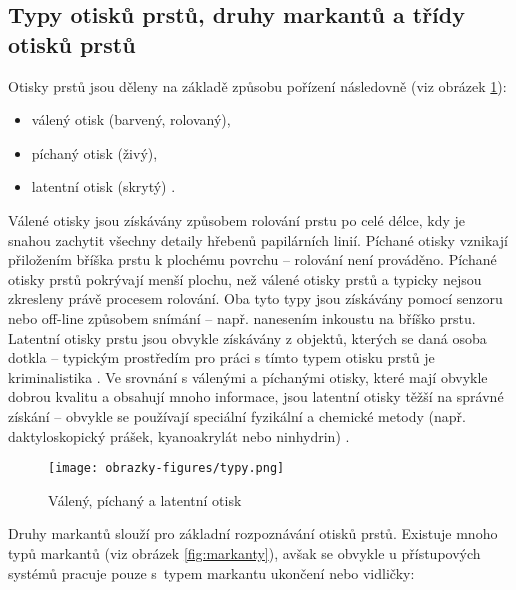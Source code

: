 \subsection{Typy otisků prstů, druhy markantů a třídy otisků prstů}
Otisky prstů jsou děleny na základě způsobu pořízení následovně (viz obrázek \ref{fig:typy}):
\begin{itemize}
\item válený otisk (barvený, rolovaný),
\item píchaný otisk (živý),
\item latentní otisk (skrytý) \cite{BIOopora}.
\end{itemize}

Válené otisky jsou získávány způsobem rolování prstu po celé délce, kdy je snahou zachytit všechny detaily hřebenů papilárních linií. Píchané otisky vznikají přiložením bříška prstu k plochému povrchu -- rolování není prováděno. Píchané otisky prstů pokrývají menší plochu, než válené otisky prstů a typicky nejsou zkresleny právě procesem rolování. Oba tyto typy jsou získávány pomocí senzoru nebo off-line způsobem snímání -- např. nanesením inkoustu na bříško prstu. Latentní otisky prstu jsou obvykle získávány z objektů, kterých se daná osoba dotkla -- typickým prostředím pro práci s tímto typem otisku prstů je kriminalistika \cite{LatentFingerprintMatching}. Ve srovnání s válenými a píchanými otisky, které mají obvykle dobrou kvalitu a obsahují mnoho informace, jsou latentní otisky těžší na správné získání -- obvykle se používají speciální fyzikální a chemické metody (např. daktyloskopický prášek, kyanoakrylát nebo ninhydrin) \cite{BIOdaktylLecture}.\\

\begin{figure}[ht!]
    \centering
    \texttt{[image: obrazky-figures/typy.png]}
    \caption{Válený, píchaný a latentní otisk \cite{BIOopora}}
    \label{fig:typy}
\end{figure}

Druhy markantů slouží pro základní rozpoznávání otisků prstů. Existuje mnoho typů markantů (viz obrázek \ref{fig:markanty}), avšak se obvykle u přístupových systémů pracuje pouze s~typem markantu ukončení nebo vidličky:

